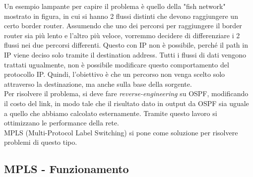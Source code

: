 \documentclass{article}
\begin{document}
\noindent Un esempio lampante per capire il problema è quello della "fish network" mostrato in figura, in cui si hanno 2 flussi distinti che devono raggiungere un certo border router. Assumendo che uno dei percorsi per raggiungere il border router sia più lento e l'altro più veloce, vorremmo decidere di differenziare i 2 flussi nei due percorsi differenti. Questo con IP non è possibile, perché il path in IP viene deciso solo tramite il destination address. Tutti i flussi di dati vengono trattati ugualmente, non è possibile modificare questo comportamento del protocollo IP. Quindi, l'obiettivo è che un percorso non venga scelto solo attraverso la destinazione, ma anche sulla base della sorgente. \\ Per risolvere il problema, si deve fare \textit{reverse-engineering} su OSPF, modificando il costo del link, in modo tale che il risultato dato in output da OSPF sia uguale a quello che abbiamo calcolato esternamente. Tramite questo lavoro si ottimizzano le performance della rete. \\ MPLS (Multi-Protocol Label Switching) si pone come soluzione per risolvere problemi di questo tipo.

\newpage
\subsection{MPLS - Funzionamento}
\end{document}
